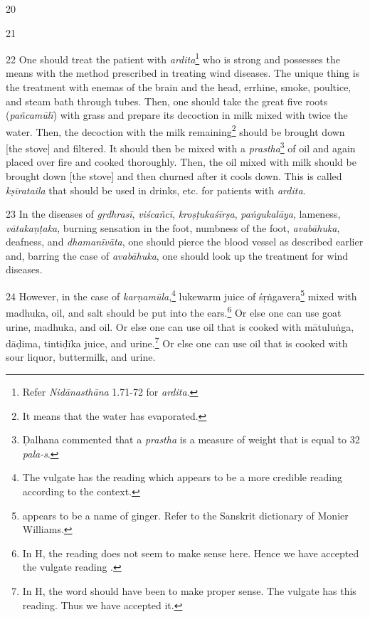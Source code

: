 \begin{translation}
    \item[20]

    \item[21] 

    \item[22]
    One should treat the patient with \textit{ardita}\footnote{Refer 
    \textit{Nidānasthāna} 1.71-72 for \textit{ardita}.} who is strong and possesses 
    the means with the method prescribed in treating wind diseases. The unique 
    thing is the treatment with enemas of the brain and the head, errhine, smoke, 
    poultice, and steam bath through tubes. Then, one should take the great five 
    roots (\textit{pañcamūlī}) with grass and prepare its decoction in milk mixed 
    with twice the water. Then, the decoction with the milk remaining\footnote{It 
    means that the water has evaporated.} should be brought down [the stove] 
    and filtered. It should then be mixed with a \textit{prastha}\footnote{Ḍalhana 
    commented \citep[425]{vulgate} that a \textit{prastha} is a measure of 
    weight that is equal to 32 \textit{pala-s}.} of oil and again placed over fire and 
    cooked thoroughly. Then, the oil mixed with milk should be brought down [the 
    stove] and then churned after it cools down. This is called \textit{kṣīrataila} 
    that should be used in drinks, etc. for patients with \textit{ardita}.  

    \item[23]
    In the diseases of \textit{gṛdhrasī}, \textit{viścañcī}, \textit{kroṣṭukaśīrṣa}, \textit{paṅgukalāya}, lameness, \textit{vātakaṇṭaka}, burning sensation in the foot, numbness of the foot, \textit{avabāhuka}, deafness, and \textit{dhamanīvāta}, one should pierce the blood vessel as described earlier and, barring the case of \textit{avabāhuka}, one should look up the treatment for wind diseases.

    \item[24]
    However, in the case of \textit{karṇamūla},\footnote{The vulgate has the reading  which appears to be a more credible reading according to the context.} lukewarm juice of \gls{śṛṅgavera}\footnote{ appears to be a name of ginger. Refer to the Sanskrit dictionary of Monier Williams.} mixed with \gls{madhuka}, oil, and salt should be put into the ears.\footnote{In H, the reading  does not seem to make sense here. Hence we have accepted the vulgate reading .} Or else one can use goat urine, \gls{madhuka}, and oil. Or else one can use oil that is cooked with \gls{mātuluṅga}, \gls{dāḍima}, \gls{tintiḍīka} juice, and urine.\footnote{In H, the word  should have been  to make proper sense. The vulgate has this reading. Thus we have accepted it.} Or else one can use oil that is cooked with sour liquor, buttermilk, and urine. 
    

\end{translation}
